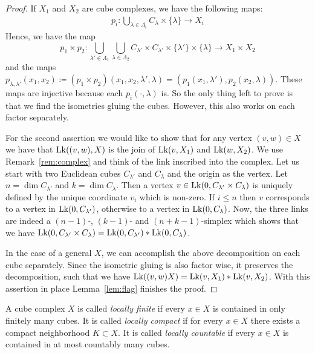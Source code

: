 \begin{proof}
  If \(X_1\) and \(X_2\) are cube complexes, we have the following maps:
  \begin{align*}
    p_i \colon \bigcup_{\lambda \in \Lambda_i} C_\lambda \times \{\lambda\} \to X_i
  \end{align*}
  Hence, we have the map
  \[
    p_1 \times p_2 \colon \bigcup_{\lambda' \in \Lambda_1} \bigcup_{\lambda \in \Lambda_2} C_{\lambda'} \times C_{\lambda'} \times \{\lambda'\} \times \{\lambda\} \to X_1 \times X_2
  \]
  and the maps \(p_{\lambda, \lambda'}(x_1,x_2) \coloneqq (p_1 \times p_2)(x_1, x_2, \lambda', \lambda) = (p_1(x_1, \lambda'), p_2(x_2, \lambda))\). These maps are injective because each \(p_i(\cdot, \lambda)\) is. So the only thing left to prove is that we find the isometries gluing the cubes. However, this also works on each factor separately.

  For the second assertion we would like to show that for any vertex \((v,w) \in X\) we have that \(\operatorname{Lk}((v,w), X)\) is the join of \(\operatorname{Lk}(v, X_1)\) and \(\operatorname{Lk}(w,X_2)\). We use Remark~\ref{rem:complex} and think of the link inscribed into the complex. Let us start with two Euclidean cubes \(C_{\lambda'}\) and \(C_\lambda\) and the origin as the vertex. Let \(n = \dim C_{\lambda'}\) and \(k = \dim C_\lambda\). Then a vertex \(v \in \operatorname{Lk}(0, C_{\lambda'} \times C_{\lambda})\) is uniquely defined by the unique coordinate \(v_i\) which is non-zero. If \(i \leq n\) then \(v\) corresponds to a vertex in \(\operatorname{Lk}(0, C_{\lambda'})\), otherwise to a vertex in \(\operatorname{Lk}(0, C_\lambda)\). Now, the three links are indeed a \((n-1)\)-, \((k-1)\)- and \((n+k-1)\)-simplex which shows that we have \(\operatorname{Lk}(0, C_{\lambda'} \times C_\lambda) = \operatorname{Lk}(0, C_{\lambda'}) \ast \operatorname{Lk}(0, C_{\lambda})\).

  In the case of a general \(X\), we can accomplish the above decomposition on each cube separately. Since the isometric gluing is also factor wise, it preserves the decomposition, such that we have \(\operatorname{Lk}((v,w) X) = \operatorname{Lk}(v, X_1) \ast \operatorname{Lk}(v, X_2)\). With this assertion in place Lemma~\ref{lem:flag} finishes the proof.
\end{proof}

\begin{defin}
  A cube complex \(X\) is called \emph{locally finite} if every \(x \in X\) is contained in only finitely many cubes. It is called \emph{locally compact} if for every \(x \in X\) there exists a compact neighborhood \(K \subset X\). It is called \emph{locally countable} if every \(x \in X\) is contained in at most countably many cubes.
\end{defin}

